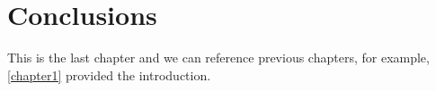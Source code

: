 \chapter{Conclusions} \label{chapter4}

This is the last chapter and we can reference previous chapters, for example,
\autoref{chapter1} provided the introduction.


